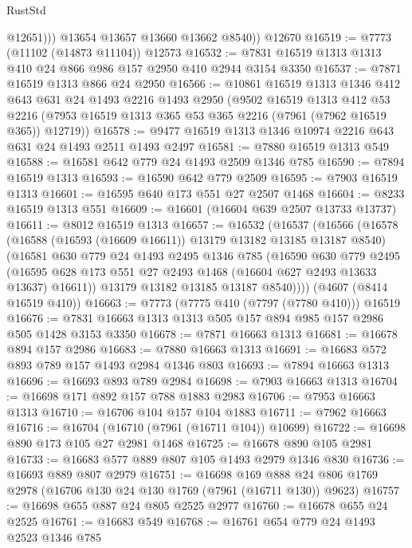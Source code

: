 \begin{lexlean}{RustStd}
\begin{coremodule}
              @12651)))
        @13654
        @13657
        @13660
        @13662
        @8540))
    @12670
@16519 := @7773 (@11102 (@14873 @11104)) @12573
@16532 := @7831 @16519 @1313 @1313 @410 @24 @866 @986 @157 @2950 @410 @2944 @3154 @3350
@16537 := @7871 @16519 @1313 @866 @24 @2950
@16566 := @10861
    @16519
    @1313
    @1346
    @412
    @643
    @631
    @24
    @1493
    @2216
    @1493
    @2950
    (@9502
      @16519
      @1313
      @412
      @53
      @2216
      (@7953 @16519 @1313 @365 @53 @365 @2216 (@7961 (@7962 @16519 @365)) @12719))
@16578 := @9477 @16519 @1313 @1346 @10974 @2216 @643 @631 @24 @1493 @2511 @1493 @2497
@16581 := @7880 @16519 @1313 @549
@16588 := @16581 @642 @779 @24 @1493 @2509 @1346 @785
@16590 := @7894 @16519 @1313
@16593 := @16590 @642 @779 @2509
@16595 := @7903 @16519 @1313
@16601 := @16595 @640 @173 @551 @27 @2507 @1468
@16604 := @8233 @16519 @1313 @551
@16609 := @16601 (@16604 @639 @2507 @13733 @13737)
@16611 := @8012 @16519 @1313
@16657 := @16532
    (@16537
      (@16566
        (@16578
          (@16588 (@16593 (@16609 @16611)) @13179 @13182 @13185 @13187 @8540)
          (@16581
            @630
            @779
            @24
            @1493
            @2495
            @1346
            @785
            (@16590
              @630
              @779
              @2495
              (@16595 @628 @173 @551 @27 @2493 @1468 (@16604 @627 @2493 @13633 @13637) @16611))
            @13179
            @13182
            @13185
            @13187
            @8540))))
    (@4607 (@8414 @16519 @410))
@16663 := @7773 (@7775 @410 (@7797 (@7780 @410))) @16519
@16676 := @7831 @16663 @1313 @1313 @505 @157 @894 @985 @157 @2986 @505 @1428 @3153 @3350
@16678 := @7871 @16663 @1313
@16681 := @16678 @894 @157 @2986
@16683 := @7880 @16663 @1313
@16691 := @16683 @572 @893 @789 @157 @1493 @2984 @1346 @803
@16693 := @7894 @16663 @1313
@16696 := @16693 @893 @789 @2984
@16698 := @7903 @16663 @1313
@16704 := @16698 @171 @892 @157 @788 @1883 @2983
@16706 := @7953 @16663 @1313
@16710 := @16706 @104 @157 @104 @1883
@16711 := @7962 @16663
@16716 := @16704 (@16710 (@7961 (@16711 @104)) @10699)
@16722 := @16698 @890 @173 @105 @27 @2981 @1468
@16725 := @16678 @890 @105 @2981
@16733 := @16683 @577 @889 @807 @105 @1493 @2979 @1346 @830
@16736 := @16693 @889 @807 @2979
@16751 := @16698
    @169
    @888
    @24
    @806
    @1769
    @2978
    (@16706 @130 @24 @130 @1769 (@7961 (@16711 @130)) @9623)
@16757 := @16698 @655 @887 @24 @805 @2525 @2977
@16760 := @16678 @655 @24 @2525
@16761 := @16683 @549
@16768 := @16761 @654 @779 @24 @1493 @2523 @1346 @785

\end{coremodule}
\end{lexlean}
